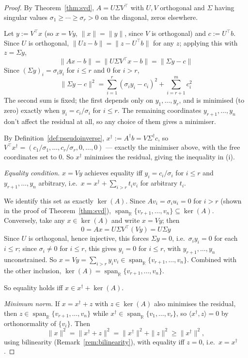 	\begin{proof}
		By Theorem~\ref{thm:svd}, $A = U\Sigma V^\top$ with $U,V$ orthogonal and $\Sigma$ having singular values $\sigma_1\ge\cdots\ge\sigma_r>0$ on the diagonal, zeros elsewhere.
		
		Let $y := V^\top x$ (so $x=Vy$, $\|x\|=\|y\|$, since $V$ is orthogonal) and $c := U^\top b$. Since $U$ is orthogonal, $\|Uz-b\|=\|z-U^\top b\|$ for any $z$; applying this with $z=\Sigma y$,
		\[
			\|Ax-b\| = \|U\Sigma V^\top x - b\| = \|\Sigma y - c\|
		\]
		Since $(\Sigma y)_i=\sigma_i y_i$ for $i\le r$ and $0$ for $i>r$,
		\[
			\|\Sigma y-c\|^2 = \sum_{i=1}^{r}(\sigma_i y_i-c_i)^2 + \sum_{i=r+1}^{m}c_i^2
		\]
		The second sum is fixed; the first depends only on $y_1,\dots,y_r$, and is minimised (to zero) exactly when $y_i=c_i/\sigma_i$ for $i\le r$. The remaining coordinates $y_{r+1},\dots,y_n$ don't affect the residual at all, so any choice of them gives a minimiser.
		
		By Definition~\ref{def:pseudoinverse}, $x^\dagger := A^\dagger b = V\Sigma^\dagger c$, so $V^\top x^\dagger = (c_1/\sigma_1,\dots,c_r/\sigma_r,0,\dots,0)$ — exactly the minimiser above, with the free coordinates set to $0$. So $x^\dagger$ minimises the residual, giving the inequality in (i).
		
		\textit{Equality condition.} $x=Vy$ achieves equality iff $y_i=c_i/\sigma_i$ for $i\le r$ and $y_{r+1},\dots,y_n$ arbitrary, i.e.\ $x = x^\dagger + \sum_{i>r}t_iv_i$ for arbitrary $t_i$.
		
		We identify this set as exactly $\ker(A)$. Since $Av_i=\sigma_iu_i=0$ for $i>r$ (shown in the proof of Theorem~\ref{thm:svd}), $\operatorname{span}_{\mathbb{R}}\{v_{r+1},\dots,v_n\}\subseteq\ker(A)$. Conversely, take any $x\in\ker(A)$ and write $x=Vy$; then
		\[
			0 = Ax = U\Sigma V^\top(Vy) = U\Sigma y
		\]
		Since $U$ is orthogonal, hence injective, this forces $\Sigma y=0$, i.e.\ $\sigma_iy_i=0$ for each $i\le r$; since $\sigma_i\neq0$ for $i\le r$, this gives $y_i=0$ for $i\le r$, with $y_{r+1},\dots,y_n$ unconstrained. So $x=Vy=\sum_{i>r}y_iv_i \in \operatorname{span}_{\mathbb{R}}\{v_{r+1},\dots,v_n\}$. Combined with the other inclusion, $\ker(A)=\operatorname{span}_{\mathbb{R}}\{v_{r+1},\dots,v_n\}$.
		
		So equality holds iff $x\in x^\dagger+\ker(A)$.
		
		\textit{Minimum norm.} If $x=x^\dagger+z$ with $z\in\ker(A)$ also minimises the residual, then $z\in\operatorname{span}_{\mathbb{R}}\{v_{r+1},\dots,v_n\}$ while $x^\dagger\in\operatorname{span}_{\mathbb{R}}\{v_1,\dots,v_r\}$, so $\langle x^\dagger,z\rangle=0$ by orthonormality of $\{v_i\}$. Then
		\[
			\|x\|^2 = \|x^\dagger+z\|^2 = \|x^\dagger\|^2+\|z\|^2 \ge \|x^\dagger\|^2,
		\]
		using bilinearity (Remark~\ref{rem:bilinearity}), with equality iff $z=0$, i.e.\ $x=x^\dagger$.
	\end{proof}
	
